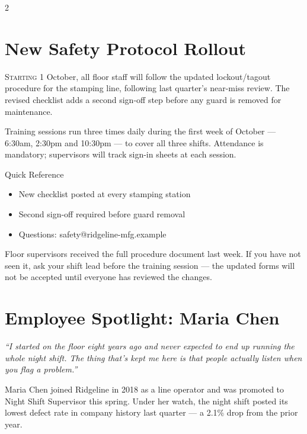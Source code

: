\documentclass[10pt]{article}
\begin{document}
\begin{multicols}{2}

\section*{New Safety Protocol Rollout}

\lettrine[lines=2]{S}{tarting} 1 October, all floor staff will follow the
updated lockout/tagout procedure for the stamping line, following last
quarter's near-miss review. The revised checklist adds a second sign-off step
before any guard is removed for maintenance.

Training sessions run three times daily during the first week of October ---
6:30am, 2:30pm and 10:30pm --- to cover all three shifts. Attendance is
mandatory; supervisors will track sign-in sheets at each session.

\begin{sidebox}{Quick Reference}
  \begin{itemize}
    \setlength\itemsep{2pt}
    \item New checklist posted at every stamping station
    \item Second sign-off required before guard removal
    \item Questions: safety@ridgeline-mfg.example
  \end{itemize}
\end{sidebox}

Floor supervisors received the full procedure document last week. If you
have not seen it, ask your shift lead before the training session --- the
updated forms will not be accepted until everyone has reviewed the changes.

\section*{Employee Spotlight: Maria Chen}

\begin{tcolorbox}[colback=gray!8, colframe=gray!40, boxrule=0.5pt,
                   left=6pt, right=6pt, top=4pt, bottom=4pt]
  \textit{``I started on the floor eight years ago and never expected to end
  up running the whole night shift. The thing that's kept me here is that
  people actually listen when you flag a problem.''}
\end{tcolorbox}

Maria Chen joined Ridgeline in 2018 as a line operator and was promoted to
Night Shift Supervisor this spring. Under her watch, the night shift posted
its lowest defect rate in company history last quarter --- a 2.1\% drop from
the prior year.


\end{multicols}
\end{document}

